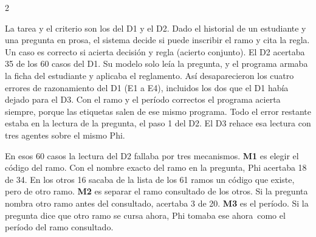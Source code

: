 \documentclass[9pt,a4paper]{extarticle}
\newcommand{\seccion}[1]{\vspace{0.6mm}{\bfseries\footnotesize\color{acento}\MakeUppercase{#1}}\par\nobreak\vspace{0.4mm}\nobreak}
\newcommand{\q}{\textquotedbl}
\begin{document}
\begin{multicols}{2}

\seccion{Tarea, falla y continuidad}

{\footnotesize
La tarea y el criterio son los del D1 y el D2. Dado el historial de un estudiante y una
pregunta en prosa, el sistema decide si puede inscribir el ramo y cita la regla. Un caso es
correcto si acierta decisión y regla (acierto conjunto). El D2 acertaba 35 de los 60 casos del
D1. Su modelo solo leía la pregunta, y el programa armaba la ficha del estudiante y aplicaba el
reglamento. Así desaparecieron los cuatro errores de razonamiento del D1 (E1 a E4), incluidos
los dos que el D1 había dejado para el D3. Con el
ramo y el período correctos el programa acierta siempre, porque las etiquetas salen de ese
mismo programa. Todo el error restante estaba en la lectura de la pregunta, el paso 1 del D2.
El D3 rehace esa lectura con tres agentes sobre el mismo Phi.

En esos 60 casos la lectura del D2 fallaba por tres mecanismos. \textbf{M1} es elegir el código del ramo.
Con el nombre exacto del ramo en la pregunta, Phi acertaba 18 de 34. En los otros 16 sacaba de la lista
de los 61 ramos un código que existe, pero de otro ramo. \textbf{M2} es separar el ramo consultado de los otros. Si la
pregunta nombra otro ramo antes del consultado, acertaba 3 de 20. \textbf{M3} es el período.
Si la pregunta dice que otro ramo se cursa \q ahora\q, Phi tomaba ese \q ahora\q\ como el
período del ramo consultado.\par}

\seccion{El grafo de agentes}

\begin{center}
\end{center}
\end{multicols}
\end{document}
